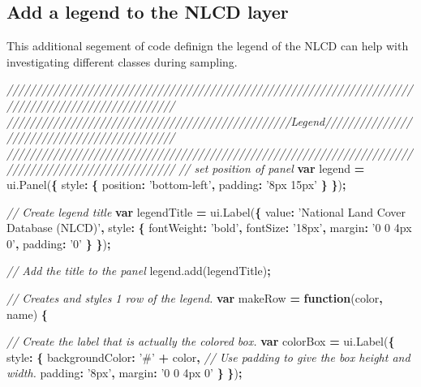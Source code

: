 \documentclass[]{article}
\newenvironment{Shaded}{\begin{snugshade}}{\end{snugshade}}
\newcommand{\KeywordTok}[1]{\textcolor[rgb]{0.13,0.29,0.53}{\textbf{#1}}}
\newcommand{\DataTypeTok}[1]{\textcolor[rgb]{0.13,0.29,0.53}{#1}}
\newcommand{\StringTok}[1]{\textcolor[rgb]{0.31,0.60,0.02}{#1}}
\newcommand{\CommentTok}[1]{\textcolor[rgb]{0.56,0.35,0.01}{\textit{#1}}}
\newcommand{\VariableTok}[1]{\textcolor[rgb]{0.00,0.00,0.00}{#1}}
\newcommand{\OperatorTok}[1]{\textcolor[rgb]{0.81,0.36,0.00}{\textbf{#1}}}
\newcommand{\AttributeTok}[1]{\textcolor[rgb]{0.77,0.63,0.00}{#1}}
\newcommand{\NormalTok}[1]{#1}
\begin{document}
\subsection{Add a legend to the NLCD
layer}\label{add-a-legend-to-the-nlcd-layer}

This additional segement of code definign the legend of the NLCD can
help with investigating different classes during sampling.

\begin{Shaded}
\begin{Highlighting}[]

\CommentTok{///////////////////////////////////////////////////////////////////////////////////////////////////}
\CommentTok{/////////////////////////////////////////////////Legend////////////////////////////////////////////}
\CommentTok{///////////////////////////////////////////////////////////////////////////////////////////////////}
\CommentTok{// set position of panel}
\KeywordTok{var}\NormalTok{ legend }\OperatorTok{=} \VariableTok{ui}\NormalTok{.}\AttributeTok{Panel}\NormalTok{(}\OperatorTok{\{}
  \DataTypeTok{style}\OperatorTok{:} \OperatorTok{\{}
    \DataTypeTok{position}\OperatorTok{:} \StringTok{'bottom-left'}\OperatorTok{,}
    \DataTypeTok{padding}\OperatorTok{:} \StringTok{'8px 15px'}
  \OperatorTok{\}}
\OperatorTok{\}}\NormalTok{)}\OperatorTok{;}

\CommentTok{// Create legend title}
\KeywordTok{var}\NormalTok{ legendTitle }\OperatorTok{=} \VariableTok{ui}\NormalTok{.}\AttributeTok{Label}\NormalTok{(}\OperatorTok{\{}
  \DataTypeTok{value}\OperatorTok{:} \StringTok{'National Land Cover Database (NLCD)'}\OperatorTok{,}
  \DataTypeTok{style}\OperatorTok{:} \OperatorTok{\{}
    \DataTypeTok{fontWeight}\OperatorTok{:} \StringTok{'bold'}\OperatorTok{,}
    \DataTypeTok{fontSize}\OperatorTok{:} \StringTok{'18px'}\OperatorTok{,}
    \DataTypeTok{margin}\OperatorTok{:} \StringTok{'0 0 4px 0'}\OperatorTok{,}
    \DataTypeTok{padding}\OperatorTok{:} \StringTok{'0'}
    \OperatorTok{\}}
\OperatorTok{\}}\NormalTok{)}\OperatorTok{;}

\CommentTok{// Add the title to the panel}
\VariableTok{legend}\NormalTok{.}\AttributeTok{add}\NormalTok{(legendTitle)}\OperatorTok{;}
    
\CommentTok{// Creates and styles 1 row of the legend.}
\KeywordTok{var}\NormalTok{ makeRow }\OperatorTok{=} \KeywordTok{function}\NormalTok{(color}\OperatorTok{,}\NormalTok{ name) }\OperatorTok{\{}
      
      \CommentTok{// Create the label that is actually the colored box.}
      \KeywordTok{var}\NormalTok{ colorBox }\OperatorTok{=} \VariableTok{ui}\NormalTok{.}\AttributeTok{Label}\NormalTok{(}\OperatorTok{\{}
        \DataTypeTok{style}\OperatorTok{:} \OperatorTok{\{}
          \DataTypeTok{backgroundColor}\OperatorTok{:} \StringTok{'#'} \OperatorTok{+}\NormalTok{ color}\OperatorTok{,}
          \CommentTok{// Use padding to give the box height and width.}
          \DataTypeTok{padding}\OperatorTok{:} \StringTok{'8px'}\OperatorTok{,}
          \DataTypeTok{margin}\OperatorTok{:} \StringTok{'0 0 4px 0'}
        \OperatorTok{\}}
      \OperatorTok{\}}\NormalTok{)}\OperatorTok{;}
      

\end{Highlighting}
\end{Shaded}
\end{document}
